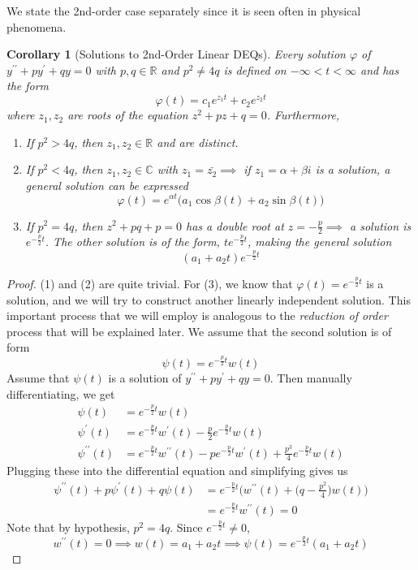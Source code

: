 \documentclass{article}
\newtheorem{corollary}{Corollary}[theorem]
\theoremstyle{remark}
\theoremstyle{definition}
\begin{document}
We state the 2nd-order case separately since it is seen often in physical phenomena. 

\begin{corollary}[Solutions to 2nd-Order Linear DEQs]
Every solution $\varphi$ of $y^{\prime\prime} + py^\prime + q y = 0$ with $p, q \in \mathbb{R}$ and $p^2 \neq 4 q$ is defined on $-\infty < t < \infty$ and has the form 
\[\varphi(t) = c_1 e^{z_1 t} + c_2 e^{z_2 t}\]
where $z_1, z_2$ are roots of the equation $z^2 + p z + q = 0$. Furthermore, 
\begin{enumerate}
    \item If $p^2 > 4q$, then $z_1, z_2 \in \mathbb{R}$ and are distinct. 
    \item If $p^2 < 4q$, then $z_1, z_2 \in \mathbb{C}$ with $z_1 = \bar{z_2} \implies$ if $z_1 = \alpha +\beta i$ is a solution, a general solution can be expressed 
\[\varphi(t) = e^{\alpha t} \big( a_1 \cos{\beta(t)} + a_2 \sin{\beta(t)}\big)\]
    \item If $p^2 = 4q$, then $z^2 + p q + p = 0$ has a double root at $z = -\frac{p}{2} \implies$ a solution is $e^{- \frac{p}{2} t}$. The other solution is of the form, $t e^{- \frac{p}{2} t}$, making the general solution 
    \[(a_1 + a_2 t) e^{-\frac{p}{2} t}\]
\end{enumerate}
\end{corollary}
\begin{proof}
(1) and (2) are quite trivial. For (3), we know that $\varphi(t) = e^{-\frac{p}{2} t}$ is a solution, and we will try to construct another linearly independent solution. This important process that we will employ is analogous to the \textit{reduction of order} process that will be explained later. We assume that the second solution is of form
\[\psi (t) = e^{-\frac{p}{2} t} w (t)\]
Assume that $\psi (t)$ is a solution of $y^{\prime\prime} + p y^\prime + q y = 0$. Then manually differentiating, we get 
\begin{align*}
    \psi (t) & = e^{-\frac{p}{2}t} w(t) \\
    \psi^\prime (t) & = e^{-\frac{p}{2} t} w^\prime (t) - \frac{p}{2} e^{-\frac{p}{2} t} w(t) \\
    \psi^{\prime\prime} (t) & = e^{-\frac{p}{2} t} w^{\prime \prime} (t) - p e^{-\frac{p}{2} t} w^\prime (t) + \frac{p^3}{4} e^{-\frac{p}{2} t} w(t) 
\end{align*}
Plugging these into the differential equation and simplifying gives us
\begin{align*}
    \psi^{\prime\prime} (t) + p \psi^\prime (t) + q \psi (t) & = e^{-\frac{p}{2} t} \bigg( w^{\prime\prime} (t) + \Big( q - \frac{p^2}{4} \Big) w(t) \bigg) \\
    & = e^{-\frac{p}{2} t} w^{\prime\prime} (t) = 0
\end{align*}
Note that by hypothesis, $p^2 = 4q$. Since $e^{-\frac{p}{2} t} \neq 0$, 
\[w^{\prime\prime} (t) = 0 \implies w (t) = a_1 + a_2 t \implies \psi(t) = e^{-\frac{p}{2} t} (a_1 + a_2 t)\]
\end{proof}
\end{document}
